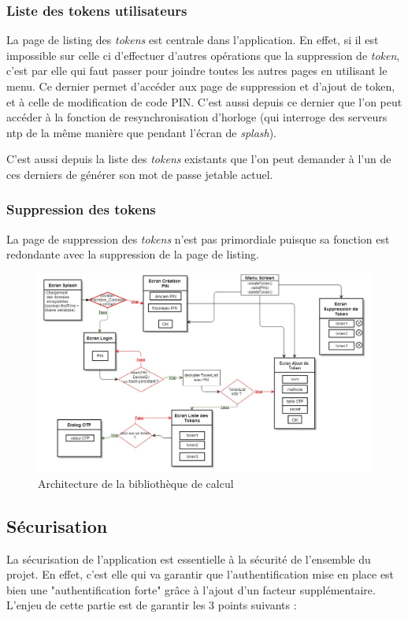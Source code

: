 \subsubsection{Liste des tokens utilisateurs}
La page de listing des \emph{tokens} est centrale dans l'application. En effet, si il est impossible sur
celle ci d'effectuer d'autres opérations que la suppression de \emph{token}, c'est par elle qui faut
passer pour joindre toutes les autres pages en utilisant le menu. Ce dernier permet d'accéder aux page
de suppression et d'ajout de token, et à celle de modification de code PIN. C'est aussi depuis ce
dernier que l'on peut accéder à la fonction de resynchronisation d'horloge (qui interroge des serveurs
ntp de la même manière que pendant l'écran de \emph{splash}).

C'est aussi depuis la liste des \emph{tokens} existants que l'on peut demander à l'un de ces derniers
de générer son mot de passe jetable actuel.

\subsubsection{Suppression des tokens}
La page de suppression des \emph{tokens} n'est pas primordiale puisque sa fonction est redondante avec
la suppression de la page de listing.

\begin{figure}
  \centering
  \includegraphics[scale=0.4]{../graphics/archi-android.jpg}
  \caption{Architecture de la bibliothèque de calcul}
  \label{fig:umlLib}
\end{figure}

\subsection{Sécurisation}
\label{secu}
La sécurisation de l'application est essentielle à la sécurité de l'ensemble du projet. En
effet, c'est elle qui va garantir que l'authentification mise en place est bien une
"authentification forte" grâce à l'ajout d'un facteur supplémentaire. L'enjeu de cette
partie est de garantir les 3 points suivants :


